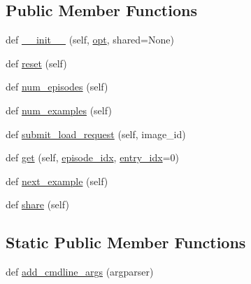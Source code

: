 \subsection*{Public Member Functions}
\begin{DoxyCompactItemize}
\item 
def \hyperlink{classparlai_1_1tasks_1_1image__chat_1_1agents_1_1ImageChatTeacher_a76afe081f47705eb7ec3a5c5c82a1761}{\+\_\+\+\_\+init\+\_\+\+\_\+} (self, \hyperlink{classparlai_1_1tasks_1_1image__chat_1_1agents_1_1ImageChatTeacher_a64b34fbd89f984698409e85197fc6327}{opt}, shared=None)
\item 
def \hyperlink{classparlai_1_1tasks_1_1image__chat_1_1agents_1_1ImageChatTeacher_aa91037220055d54a8d01877ae55a85f2}{reset} (self)
\item 
def \hyperlink{classparlai_1_1tasks_1_1image__chat_1_1agents_1_1ImageChatTeacher_ae37398f75ec883f5bbf276bf7b2cf715}{num\+\_\+episodes} (self)
\item 
def \hyperlink{classparlai_1_1tasks_1_1image__chat_1_1agents_1_1ImageChatTeacher_a79f6d03e7d21be3a61bad00252f8ea66}{num\+\_\+examples} (self)
\item 
def \hyperlink{classparlai_1_1tasks_1_1image__chat_1_1agents_1_1ImageChatTeacher_a6028198a57fccc50c4c7f4f294ed1f33}{submit\+\_\+load\+\_\+request} (self, image\+\_\+id)
\item 
def \hyperlink{classparlai_1_1tasks_1_1image__chat_1_1agents_1_1ImageChatTeacher_ac7212c1001ab9c5027ae305ffdc9298f}{get} (self, \hyperlink{classparlai_1_1core_1_1teachers_1_1FixedDialogTeacher_afd4ebab8063eb42d182d30a1a41f133e}{episode\+\_\+idx}, \hyperlink{classparlai_1_1core_1_1teachers_1_1FixedDialogTeacher_ae3201b15f3c3b46a2f3511bad9b43e7d}{entry\+\_\+idx}=0)
\item 
def \hyperlink{classparlai_1_1tasks_1_1image__chat_1_1agents_1_1ImageChatTeacher_a2b795770610618bf94e76705cb90611a}{next\+\_\+example} (self)
\item 
def \hyperlink{classparlai_1_1tasks_1_1image__chat_1_1agents_1_1ImageChatTeacher_a5208845ef2ccb323991101b60bf76396}{share} (self)
\end{DoxyCompactItemize}
\subsection*{Static Public Member Functions}
\begin{DoxyCompactItemize}
\item 
def \hyperlink{classparlai_1_1tasks_1_1image__chat_1_1agents_1_1ImageChatTeacher_ab4741aa666881eb9170c9d92a8da1742}{add\+\_\+cmdline\+\_\+args} (argparser)
\end{DoxyCompactItemize}
